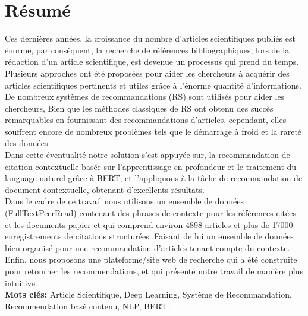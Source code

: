 \documentclass[11pt,a4paper]{report}
\begin{document}
    \hbox{\raisebox{0em}{\vrule depth 0pt height 1pt width \textwidth}}
    \section*{Résumé}
    \par Ces dernières années, la croissance du nombre d'articles scientifiques publiés est énorme, par conséquent, la recherche de références bibliographiques, lors de la rédaction d'un article scientifique, est devenue un processus qui prend du temps. Plusieurs approches ont été proposées pour aider les chercheurs à acquérir des articles scientifiques pertinents et utiles grâce à l'énorme quantité d'informations. De nombreux systèmes de recommandations (RS) sont utilisés pour aider les chercheurs, Bien que les méthodes classiques de RS ont obtenu des succès remarquables en fournissant des recommandations d'articles, cependant, elles souffrent encore de nombreux problèmes tels que le démarrage à froid et la rareté des données.\\
    Dans cette éventualité notre solution s’est appuyée sur, la recommandation de citation contextuelle basée sur l'apprentissage en profondeur et le traitement du language naturel grâce à BERT, et l'appliquons à la tâche de recommandation de document contextuelle, obtenant d'excellents résultats.\\
    Dans le cadre de ce travail nous utilisons  un ensemble de données (FullTextPeerRead) contenant des phrases de contexte pour les références citées et les documents papier et qui comprend environ 4898 articles et plus de 17000 enregistrements de citations structurées. Faisant de lui un ensemble de données bien organisé pour une recommandation d'articles tenant compte du contexte.\\
    Enfin, nous proposons une plateforme/site web de recherche qui a été construite pour retourner les recommendations, et qui présente notre travail de manière plus intuitive.\\
    \textbf{Mots clés:} Article Scientifique, Deep Learning, Système de Recommandation, Recommendation basé contenu, NLP, BERT.\\
    
    \hbox{\raisebox{0em}{\vrule depth 0pt height 1pt width \textwidth}}
    
\end{document}
